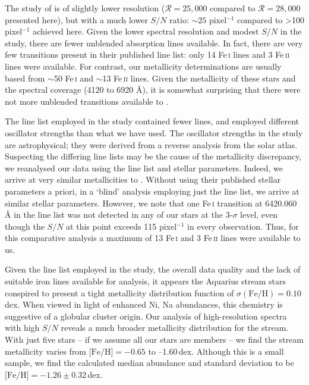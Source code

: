 \documentclass{emulateapj}
\begin{document}
The study of \citet{wylie-de-boer;et-al_2012} is of slightly lower resolution ($\mathcal{R} = 25,000$ compared to $\mathcal{R} = 28,000$ presented here), but with a much lower $S/N$ ratio: $\sim{}25$ pixel$^{-1}$ compared to >100 pixel$^{-1}$ achieved here. Given the lower spectral resolution and modest $S/N$ in the \citet{wylie-de-boer;et-al_2012} study, there are fewer unblended absorption lines available. In fact, there are very few transitions present in their published line list: only 14 Fe\,\textsc{i} lines and 3 Fe\,\textsc{ii} lines were available. For contrast, our metallicity determinations are usually based from ${\sim}$50 Fe\,\textsc{i} and ${\sim}$13 Fe\,\textsc{ii} lines. Given the metallicity of these stars and the spectral coverage (4120 to 6920 {\AA}), it is somewhat surprising that there were not more unblended transitions available to \citet{wylie-de-boer;et-al_2012}. 

The line list employed in the \citet{wylie-de-boer;et-al_2012} study contained fewer lines, and employed different oscillator strengths than what we have used. The oscillator strengths in the \citet{wylie-de-boer;et-al_2012} study are astrophysical; they were derived from a reverse analysis from the \citet{hinkle;et-al_2003} solar atlas. Suspecting the differing line lists may be the cause of the  metallicity discrepancy, we reanalysed our data using the \citet{wylie-de-boer;et-al_2012} line list and stellar parameters. Indeed, we arrive at very similar metallicities to \citet{wylie-de-boer;et-al_2012}. Without using their published stellar parameters a priori, in a `blind' analysis employing just the \citet{wylie-de-boer;et-al_2012} line list, we arrive at similar stellar parameters. However, we note that one Fe\,\textsc{i} transition at 6420.060\,\AA{} in the \citet{wylie-de-boer;et-al_2012} line list was not detected in any of our stars at the 3-$\sigma$ level, even though the $S/N$ at this point exceeds 115 pixel$^{-1}$ in every observation. Thus, for this comparative analysis a maximum of 13 Fe\,\textsc{i} and 3 Fe\,\textsc{ii} lines were available to us.

Given the line list employed in the \citet{wylie-de-boer;et-al_2012} study, the overall data quality and the lack of suitable iron lines available for analysis, it appears the Aquarius stream stars conspired to present a tight metallicity distribution function of $\sigma(\mbox{Fe/H}) = 0.10$\,dex. When viewed in light of enhanced Ni, Na abundances, this chemistry is suggestive of a globular cluster origin. Our analysis of high-resolution spectra with high $S/N$ reveals a much broader metallicity distribution for the stream. With just five stars -- if we assume all our stars are members -- we find the stream metallicity varies from $\mbox{[Fe/H]} = -0.65$ to --1.60\,dex. Although this is a small sample, we find the calculated median abundance and standard deviation to be $\mbox{[Fe/H]} = -1.26 \pm 0.32$\,dex.
\end{document}
